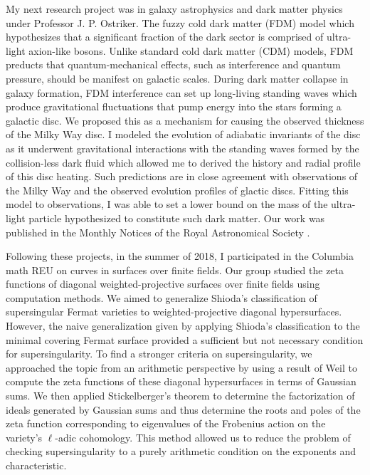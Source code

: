 \documentclass[11pt]{amsart}
\begin{document}
\par 
My next research project was in galaxy astrophysics and dark matter physics under Professor J. P. Ostriker. The fuzzy cold dark matter (FDM) model which hypothesizes that a significant fraction of the dark sector is comprised of ultra-light axion-like bosons. Unlike standard cold dark matter (CDM) models, FDM preducts that quantum-mechanical effects, such as interference and quantum pressure, should  be manifest on galactic scales. During dark matter collapse in galaxy formation, FDM interference can set up long-living standing waves which produce gravitational fluctuations that pump energy into the stars forming a galactic disc. We proposed this as a mechanism for causing the observed thickness of the Milky Way disc. I modeled the evolution of adiabatic invariants of the disc as it underwent gravitational interactions with the standing waves formed by the collision-less dark fluid which allowed me to derived the history and radial profile of this disc heating. Such predictions are in close agreement with observations of the Milky Way and the observed evolution profiles of glactic discs. Fitting this model to observations, I was able to set a lower bound on the mass of the ultra-light particle hypothesized to constitute such dark matter. Our work was published in the Monthly Notices of the Royal Astronomical Society \cite{FDM}.
\par 
Following these projects, in the summer of 2018, I participated in the Columbia math REU on curves in surfaces over finite fields. Our group studied the zeta functions of diagonal weighted-projective surfaces over finite fields using computation methods. We aimed to generalize Shioda’s classification of supersingular Fermat varieties to weighted-projective diagonal hypersurfaces. However, the naive generalization given by applying Shioda’s classification to the minimal covering Fermat surface provided a sufficient but not necessary condition for supersingularity. To find a stronger criteria on supersingularity, we approached the topic from an arithmetic perspective by using a result of Weil to compute the zeta functions of these diagonal hypersurfaces in terms of Gaussian sums. We then applied Stickelberger's theorem to determine the factorization of ideals generated by Gaussian sums and thus determine the roots and poles of the zeta function corresponding to eigenvalues of the Frobenius action on the variety’s $\ell$-adic cohomology. This method allowed us to reduce the problem of checking supersingularity to a purely arithmetic condition on the exponents and characteristic. 
\end{document}
